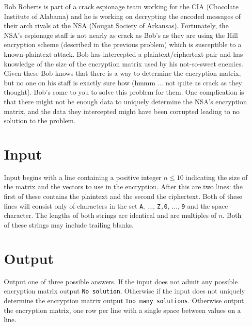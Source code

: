 
Bob Roberts is part of a crack espionage team working for the CIA (Chocolate Institute of Alabama) and he is working on decrypting the encoded messages of their arch rivals at the NSA (Nougat Society of Arkansas).  Fortunately, the NSA's espionage staff is not nearly as crack as Bob's as they are using the Hill encryption scheme (described in the previous problem) which is susceptible to a known-plaintext attack.  Bob has intercepted a plaintext/ciphertext pair and has knowledge of the size of the encryption matrix used by his not-so-sweet enemies. Given these Bob knows that there is a way to determine the encryption matrix, but no one on his staff is exactly sure how (hmmm $\ldots$ not quite as crack as they thought).  Bob's come to you to solve this problem for them.  One complication is that there might not be enough data to uniquely determine the NSA's encryption matrix, and the data they intercepted might have been corrupted leading to no solution to the problem.

\section*{Input}
Input begins with a line containing a positive integer $n \leq 10$ indicating the size of the matrix and the vectors to use in the encryption.  After this are two lines: the first of these contains the plaintext and the second the ciphertext. Both of these lines will consist only of characters in the set {\tt A}, $\ldots$, {\tt Z,0}, $\ldots$, {\tt 9} and the space character.  The lengths of both strings are identical and are multiples of $n$.  Both of these strings may include trailing blanks.

\section*{Output}
Output one of three possible answers.  If the input does not admit any possible encryption matrix output {\tt No solution}.  Otherwise if the input does not uniquely determine the encryption matrix output {\tt Too many solutions}.  Otherwise output the encryption matrix, one row per line with a single space between values on a line.
